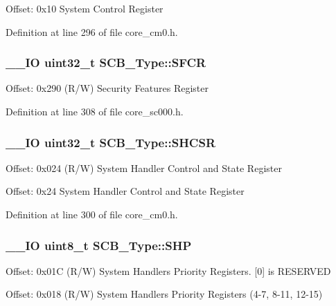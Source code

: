 Offset\-: 0x10 System Control Register 

Definition at line 296 of file core\-\_\-cm0.\-h.

\hypertarget{struct_s_c_b___type_a00ae0f2f224605dc8980a19d7624e533}{
\subsubsection[{S\-F\-C\-R}]{\setlength{\rightskip}{0pt plus 5cm}\-\_\-\-\_\-\-I\-O {\bf uint32\-\_\-t} S\-C\-B\-\_\-\-Type\-::\-S\-F\-C\-R}}\label{struct_s_c_b___type_a00ae0f2f224605dc8980a19d7624e533}
Offset\-: 0x290 (R/\-W) Security Features Register 

Definition at line 308 of file core\-\_\-sc000.\-h.

\hypertarget{struct_s_c_b___type_ae9891a59abbe51b0b2067ca507ca212f}{
\subsubsection[{S\-H\-C\-S\-R}]{\setlength{\rightskip}{0pt plus 5cm}\-\_\-\-\_\-\-I\-O {\bf uint32\-\_\-t} S\-C\-B\-\_\-\-Type\-::\-S\-H\-C\-S\-R}}\label{struct_s_c_b___type_ae9891a59abbe51b0b2067ca507ca212f}
Offset\-: 0x024 (R/\-W) System Handler Control and State Register

Offset\-: 0x24 System Handler Control and State Register 

Definition at line 300 of file core\-\_\-cm0.\-h.

\hypertarget{struct_s_c_b___type_a16d5a38234fb96ac6a5c4b2a9e78c1be}{
\subsubsection[{S\-H\-P}]{\setlength{\rightskip}{0pt plus 5cm}\-\_\-\-\_\-\-I\-O {\bf uint8\-\_\-t} S\-C\-B\-\_\-\-Type\-::\-S\-H\-P}}\label{struct_s_c_b___type_a16d5a38234fb96ac6a5c4b2a9e78c1be}
Offset\-: 0x01\-C (R/\-W) System Handlers Priority Registers. \mbox{[}0\mbox{]} is R\-E\-S\-E\-R\-V\-E\-D

Offset\-: 0x018 (R/\-W) System Handlers Priority Registers (4-\/7, 8-\/11, 12-\/15)

